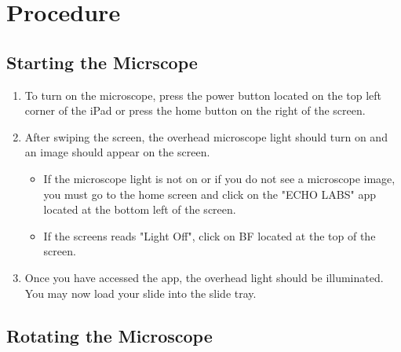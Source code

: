 \documentclass{article}
\begin{document}
\section{Procedure}

\subsection{Starting the Micrscope}

\begin{enumerate}
  \item To turn on the microscope, press the power button located on the top left corner of the iPad or press the home button on the right of the screen.
  \item After swiping the screen, the overhead microscope light should turn on and an image should appear on the screen.
  
\begin{itemize}
  \item If the microscope light is not on or if you do not see a microscope image, you must go to the home screen and click on the "ECHO LABS" app located at the bottom left of the screen.
  \item If the screens reads "Light Off", click on BF located at the top of the screen.
\end{itemize}

  \item Once you have accessed the app, the overhead light should be illuminated. You may now load your slide into the slide tray.
\end{enumerate} 
  
  
\subsection{Rotating the Microscope}
\end{document}
